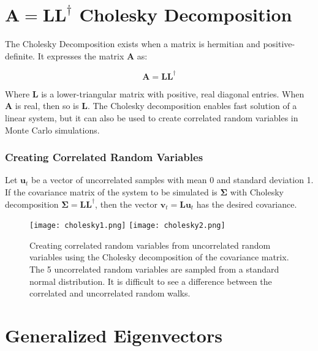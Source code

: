 \section{$\mathbf{A} = \mathbf{L}\mathbf{L}^{\dagger}$ Cholesky Decomposition}
\label{sec:cholesky}

The Cholesky Decomposition exists when a matrix is hermitian and positive-definite. It expresses the matrix $\mathbf{A}$ as:

\begin{equation}
\mathbf{A} = \mathbf{L}\mathbf{L^\dagger}
\end{equation}

Where $\mathbf{L}$ is a lower-triangular matrix with positive, real diagonal entries. When $\mathbf{A}$ is real, then so is $\mathbf{L}$. The Cholesky decomposition enables fast solution of a linear system, but it can also be used to create correlated random variables in Monte Carlo simulations. 

\subsubsection{Creating Correlated Random Variables}
Let $\mathbf{u}_t$ be a vector of uncorrelated samples with mean 0 and 	standard deviation 1. If the covariance matrix of the system to be simulated is  $\mathbf{\Sigma}$ with Cholesky decomposition $\mathbf{\Sigma} = \mathbf{LL}^\dagger$, then the vector $\mathbf{v}_t = \mathbf{Lu}_t$ has the desired covariance.

\begin{figure}
\centering
\texttt{[image: cholesky1.png]}
\texttt{[image: cholesky2.png]}
\caption{Creating correlated random variables from uncorrelated random variables using the Cholesky decomposition of the covariance matrix. The 5 uncorrelated random variables are sampled from a standard normal distribution. It is difficult to see a difference between the correlated and uncorrelated random walks.}
\end{figure}



\section{Generalized Eigenvectors}










\chapauthor{}

